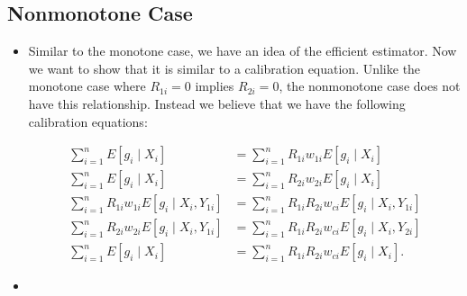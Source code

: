 \documentclass[12pt]{article}
\begin{document}
\subsection*{Nonmonotone Case}

\begin{itemize}
  \item Similar to the monotone case, we have an idea of the efficient
    estimator. Now we want to show that it is similar to a calibration equation.
    Unlike the monotone case where $R_{1i} = 0$ implies $R_{2i} = 0$, the
    nonmonotone case does not have this relationship. Instead we believe that we
    have the following calibration equations:

    \begin{align*}
      \sum_{i = 1}^n E[g_i \mid X_i] &= \sum_{i = 1}^n R_{1i} w_{1i} E[g_i \mid
      X_i]\\
      \sum_{i = 1}^n E[g_i \mid X_i] &= \sum_{i = 1}^n R_{2i} w_{2i} E[g_i \mid
      X_i]\\
      \sum_{i = 1}^n R_{1i} w_{1i} E[g_i \mid X_i, Y_{1i}] &= \sum_{i = 1}^n
      R_{1i} R_{2i} w_{ci} E[g_i \mid X_i, Y_{1i}]\\
      \sum_{i = 1}^n R_{2i} w_{2i} E[g_i \mid X_i, Y_{1i}] &= \sum_{i = 1}^n
      R_{1i} R_{2i} w_{ci} E[g_i \mid X_i, Y_{2i}]\\
      \sum_{i = 1}^n E[g_i \mid X_i] &= \sum_{i = 1}^n R_{1i} R_{2i} w_{ci}
      E[g_i \mid X_i].
    \end{align*}
  
  \item %
\end{itemize}












\newpage
\end{document}
